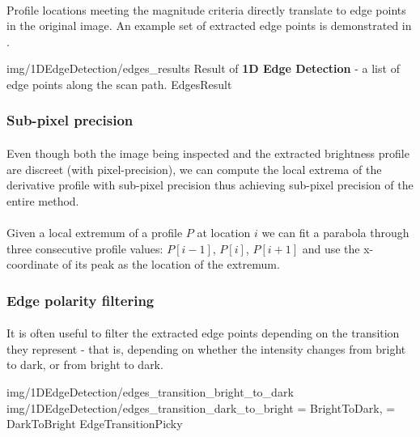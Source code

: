 \paragraph*{}
Profile locations meeting the magnitude criteria directly translate to edge points in the original image. An example set of extracted edge points is demonstrated in .

\oneFigure
{img/1DEdgeDetection/edges_results}
{Result of \textbf{1D Edge Detection} - a list of edge points along the scan path.}
{EdgesResult}
{\basicWidth}

\subsubsection{Sub-pixel precision}

\paragraph*{}
Even though both the image being inspected and the extracted brightness profile are discreet (with pixel-precision), we can compute the local extrema of the derivative profile with sub-pixel precision thus achieving sub-pixel precision of the entire method.

\paragraph*{}
Given a local extremum of a profile $P$ at location $i$ we can fit a parabola through three consecutive profile values: $P[i-1]$, $P[i]$, $P[i+1]$ and use the x-coordinate of its peak as the location of the extremum.

\subsubsection{Edge polarity filtering}
\paragraph*{}
It is often useful to filter the extracted edge points depending on the transition they represent - that is, depending on whether the intensity changes from bright to dark, or from bright to dark.

\twoFigures
{img/1DEdgeDetection/edges_transition_bright_to_dark}
{img/1DEdgeDetection/edges_transition_dark_to_bright}
{ = BrightToDark,  = DarkToBright}
{EdgeTransitionPicky}
{\basicWidth}

